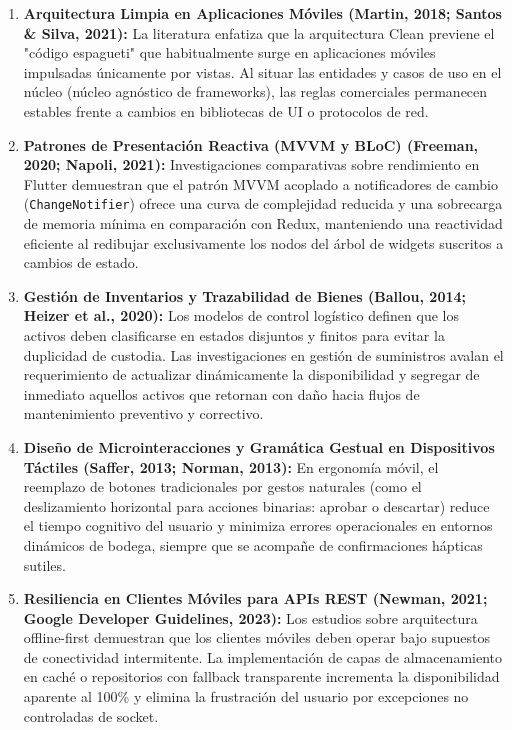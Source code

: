 \documentclass[12pt,a4paper]{article}
\begin{document}
\begin{enumerate}
    \item \textbf{Arquitectura Limpia en Aplicaciones Móviles (Martin, 2018; Santos \& Silva, 2021):} La literatura enfatiza que la arquitectura Clean previene el "código espagueti" que habitualmente surge en aplicaciones móviles impulsadas únicamente por vistas. Al situar las entidades y casos de uso en el núcleo (núcleo agnóstico de frameworks), las reglas comerciales permanecen estables frente a cambios en bibliotecas de UI o protocolos de red.
    \item \textbf{Patrones de Presentación Reactiva (MVVM y BLoC) (Freeman, 2020; Napoli, 2021):} Investigaciones comparativas sobre rendimiento en Flutter demuestran que el patrón MVVM acoplado a notificadores de cambio (\texttt{ChangeNotifier}) ofrece una curva de complejidad reducida y una sobrecarga de memoria mínima en comparación con Redux, manteniendo una reactividad eficiente al redibujar exclusivamente los nodos del árbol de widgets suscritos a cambios de estado.
    \item \textbf{Gestión de Inventarios y Trazabilidad de Bienes (Ballou, 2014; Heizer et al., 2020):} Los modelos de control logístico definen que los activos deben clasificarse en estados disjuntos y finitos para evitar la duplicidad de custodia. Las investigaciones en gestión de suministros avalan el requerimiento de actualizar dinámicamente la disponibilidad y segregar de inmediato aquellos activos que retornan con daño hacia flujos de mantenimiento preventivo y correctivo.
    \item \textbf{Diseño de Microinteracciones y Gramática Gestual en Dispositivos Táctiles (Saffer, 2013; Norman, 2013):} En ergonomía móvil, el reemplazo de botones tradicionales por gestos naturales (como el deslizamiento horizontal para acciones binarias: aprobar o descartar) reduce el tiempo cognitivo del usuario y minimiza errores operacionales en entornos dinámicos de bodega, siempre que se acompañe de confirmaciones hápticas sutiles.
    \item \textbf{Resiliencia en Clientes Móviles para APIs REST (Newman, 2021; Google Developer Guidelines, 2023):} Los estudios sobre arquitectura offline-first demuestran que los clientes móviles deben operar bajo supuestos de conectividad intermitente. La implementación de capas de almacenamiento en caché o repositorios con fallback transparente incrementa la disponibilidad aparente al 100\% y elimina la frustración del usuario por excepciones no controladas de socket.
\end{enumerate}
\end{document}
